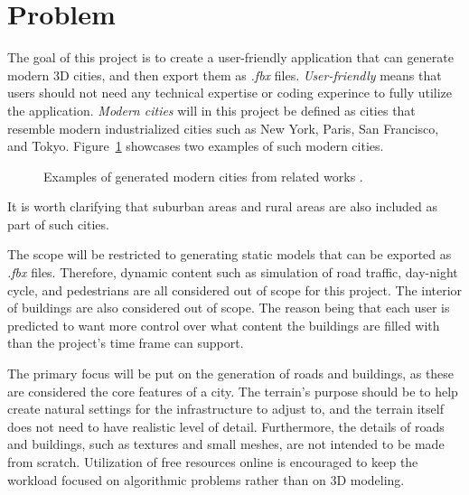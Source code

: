 \newpage
\section{Problem}
\label{sec:problem}

The goal of this project is to create a user-friendly application that can generate modern 3D cities, and then export them as \textit{.fbx} files.
\textit{User-friendly} means that users should not need any technical expertise or coding experince to fully utilize the application.
\textit{Modern cities} will in this project be defined as cities that resemble modern industrialized cities such as New York, Paris, San Francisco, and Tokyo.
Figure~\ref{fig:ModernCities} showcases two examples of such modern cities.

\begin{figure}[h!]
  \centering

  \begin{subfigure}[b]{0.48\textwidth}
  \end{subfigure}
  \quad
  \begin{subfigure}[b]{0.48\textwidth}
  \end{subfigure}

  \caption{Examples of generated modern cities from related works \cite{yoav_and_pascal}\cite{cl3ver}.}
  \label{fig:ModernCities}
\end{figure}

It is worth clarifying that suburban areas and rural areas are also included as
part of such cities.

The scope will be restricted to generating static models that can be exported as \textit{.fbx} files.
Therefore, dynamic content such as simulation of road traffic, day-night cycle, and pedestrians are all considered out of scope for this project.
The interior of buildings are also considered out of scope.
The reason being that each user is predicted to want more control over what content the buildings are filled with than the project's time frame can support.

The primary focus will be put on the generation of roads and buildings, as these are considered the core features of a city.
The terrain's purpose should be to help create natural settings for the infrastructure to adjust to, and the terrain itself does not need to have realistic level of detail.
Furthermore, the details of roads and buildings, such as textures and small meshes, are not intended to be made from scratch.
Utilization of free resources online is encouraged to keep the workload focused on algorithmic problems rather than on 3D modeling.

